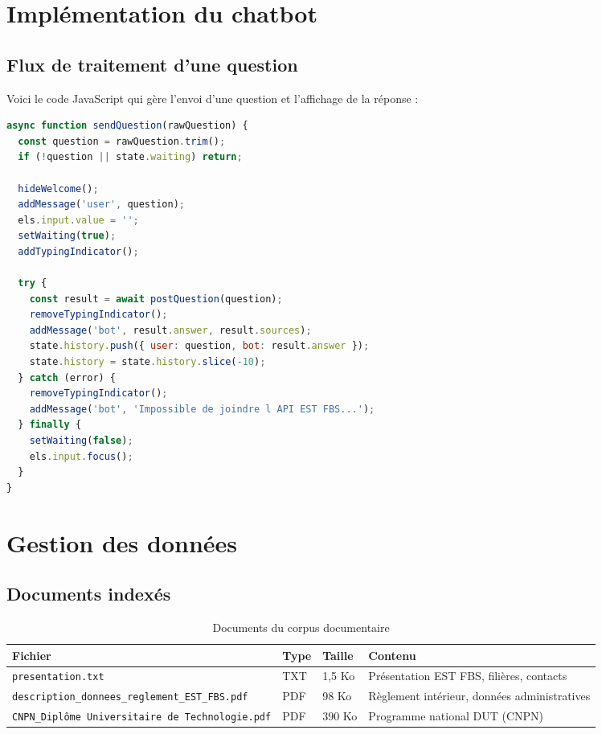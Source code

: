 \documentclass[12pt, a4paper, twoside]{report}
\newcommand{\file}[1]{\texttt{\footnotesize #1}}
\begin{document}
\section{Implémentation du chatbot}

\subsection{Flux de traitement d'une question}

Voici le code JavaScript qui gère l'envoi d'une question et l'affichage de la réponse :

\begin{lstlisting}[language=javascript, caption={Fonction principale d'envoi de question (index.html)}, label={lst:frontend-send}]
async function sendQuestion(rawQuestion) {
  const question = rawQuestion.trim();
  if (!question || state.waiting) return;

  hideWelcome();
  addMessage('user', question);
  els.input.value = '';
  setWaiting(true);
  addTypingIndicator();

  try {
    const result = await postQuestion(question);
    removeTypingIndicator();
    addMessage('bot', result.answer, result.sources);
    state.history.push({ user: question, bot: result.answer });
    state.history = state.history.slice(-10);
  } catch (error) {
    removeTypingIndicator();
    addMessage('bot', 'Impossible de joindre l API EST FBS...');
  } finally {
    setWaiting(false);
    els.input.focus();
  }
}
\end{lstlisting}

\section{Gestion des données}

\subsection{Documents indexés}

\begin{table}[H]
\centering
\caption{Documents du corpus documentaire}
\label{tab:documents}
\begin{tabularx}{\textwidth}{l l l X}
\toprule
\rowcolor{primary!10}
\textbf{Fichier} & \textbf{Type} & \textbf{Taille} & \textbf{Contenu} \\
\midrule
\file{presentation.txt} & TXT & 1,5 Ko & Présentation EST FBS, filières, contacts \\
\file{description\_donnees\_reglement\_EST\_FBS.pdf} & PDF & 98 Ko & Règlement intérieur, données administratives \\
\file{CNPN\_Diplôme Universitaire de Technologie.pdf} & PDF & 390 Ko & Programme national DUT (CNPN) \\
\bottomrule
\end{tabularx}
\end{table}
\end{document}
